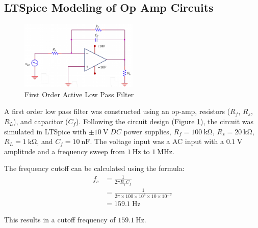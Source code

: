 \documentclass[12pt]{article}
\begin{document}
\subsection{LTSpice Modeling of Op Amp Circuits}
\begin{figure}[H]
	\centering
	\includegraphics[width=0.5\textwidth]{photos/First Order Active Low Pass Filter.png}
	\caption{First Order Active Low Pass Filter}
	\label{fig:FirstOrderActiveLowPassFilter}
\end{figure}

A first order low pass filter was constructed using an op-amp, resistors
($R_f$, $R_s$, $R_L$), and capacitor ($C_f$). Following the circuit design
(Figure \ref{fig:FirstOrderActiveLowPassFilter}), the circuit was simulated in LTSpice
with $\pm \SI{10}{\volt} \; DC$ power supplies, $R_f = \SI{100}{\kilo\ohm}$, $R_s = \SI{20}{\kilo\ohm}$,
$R_L = \SI{1}{\kilo\ohm}$, and $C_f = \SI{10}{\nano\farad}$. The voltage input was a
AC input with a $\SI{0.1}{\volt}$ amplitude and a frequency sweep from $\SI{1}{\hertz}$
to $\SI{1}{\mega\hertz}$.
\newline

The frequency cutoff can be calculated using the formula:
\[
	\begin{aligned}
		f_c & = \frac{1}{2\pi R_f C_f}                                         \\
		    & = \frac{1}{2\pi \times 100 \times 10^3 \times 10 \times 10^{-9}} \\
			& = \SI{159.1}{\hertz}
	\end{aligned}
\]

This results in a cutoff frequency of $\SI{159.1}{\hertz}$.
\end{document}
